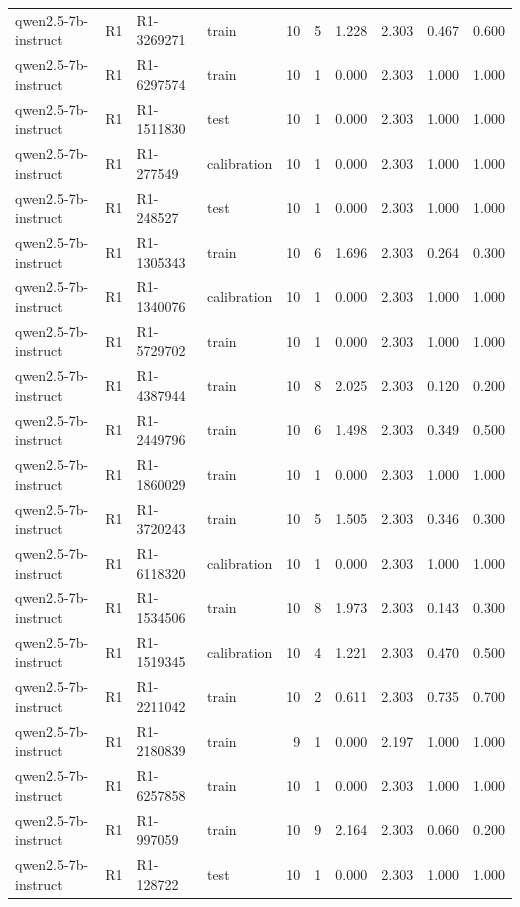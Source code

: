 \begin{table}
\begin{tabular}{llllrrrrrr}
qwen2.5-7b-instruct & R1 & R1-3269271 & train & 10 & 5 & 1.228 & 2.303 & 0.467 & 0.600 \\
qwen2.5-7b-instruct & R1 & R1-6297574 & train & 10 & 1 & 0.000 & 2.303 & 1.000 & 1.000 \\
qwen2.5-7b-instruct & R1 & R1-1511830 & test & 10 & 1 & 0.000 & 2.303 & 1.000 & 1.000 \\
qwen2.5-7b-instruct & R1 & R1-277549 & calibration & 10 & 1 & 0.000 & 2.303 & 1.000 & 1.000 \\
qwen2.5-7b-instruct & R1 & R1-248527 & test & 10 & 1 & 0.000 & 2.303 & 1.000 & 1.000 \\
qwen2.5-7b-instruct & R1 & R1-1305343 & train & 10 & 6 & 1.696 & 2.303 & 0.264 & 0.300 \\
qwen2.5-7b-instruct & R1 & R1-1340076 & calibration & 10 & 1 & 0.000 & 2.303 & 1.000 & 1.000 \\
qwen2.5-7b-instruct & R1 & R1-5729702 & train & 10 & 1 & 0.000 & 2.303 & 1.000 & 1.000 \\
qwen2.5-7b-instruct & R1 & R1-4387944 & train & 10 & 8 & 2.025 & 2.303 & 0.120 & 0.200 \\
qwen2.5-7b-instruct & R1 & R1-2449796 & train & 10 & 6 & 1.498 & 2.303 & 0.349 & 0.500 \\
qwen2.5-7b-instruct & R1 & R1-1860029 & train & 10 & 1 & 0.000 & 2.303 & 1.000 & 1.000 \\
qwen2.5-7b-instruct & R1 & R1-3720243 & train & 10 & 5 & 1.505 & 2.303 & 0.346 & 0.300 \\
qwen2.5-7b-instruct & R1 & R1-6118320 & calibration & 10 & 1 & 0.000 & 2.303 & 1.000 & 1.000 \\
qwen2.5-7b-instruct & R1 & R1-1534506 & train & 10 & 8 & 1.973 & 2.303 & 0.143 & 0.300 \\
qwen2.5-7b-instruct & R1 & R1-1519345 & calibration & 10 & 4 & 1.221 & 2.303 & 0.470 & 0.500 \\
qwen2.5-7b-instruct & R1 & R1-2211042 & train & 10 & 2 & 0.611 & 2.303 & 0.735 & 0.700 \\
qwen2.5-7b-instruct & R1 & R1-2180839 & train & 9 & 1 & 0.000 & 2.197 & 1.000 & 1.000 \\
qwen2.5-7b-instruct & R1 & R1-6257858 & train & 10 & 1 & 0.000 & 2.303 & 1.000 & 1.000 \\
qwen2.5-7b-instruct & R1 & R1-997059 & train & 10 & 9 & 2.164 & 2.303 & 0.060 & 0.200 \\
qwen2.5-7b-instruct & R1 & R1-128722 & test & 10 & 1 & 0.000 & 2.303 & 1.000 & 1.000 \\

\end{tabular}
\end{table}
